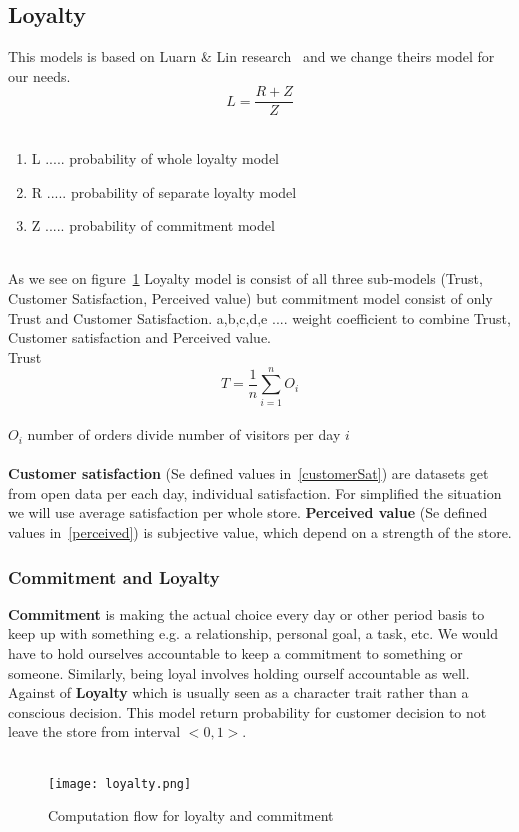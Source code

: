 \subsection{Loyalty} \label{subsec:model_loyalty}
This models is based on Luarn \& Lin research~\cite{luarn} and we change theirs model for our needs.\\
\begin{equation} \label{eq:30}
L = \frac{R+Z}{Z}
\end{equation}
\\
\begin{enumerate}
    \item L ..... probability of whole loyalty model
    \item R ..... probability of separate loyalty model
    \item Z ..... probability of commitment model
\end{enumerate}
\\
As we see on figure~\ref{Loyalty scheme} Loyalty model is consist of all three sub-models (Trust, Customer Satisfaction, Perceived value)
but commitment model consist of only Trust and Customer Satisfaction.
a,b,c,d,e .... weight coefficient to combine Trust, Customer satisfaction and Perceived value.\\
\newpage
Trust
\begin{equation} \label{eq:31}
T = \frac{1}{n} \sum_{i=1}^{n} O_i
\end{equation}
\\
$O_i$ number of orders divide number of visitors per day $i$
\\
\\
\textbf{Customer satisfaction} (Se defined values in~\ref{customerSat}) are datasets get from open data per each day, individual satisfaction.
For simplified the situation we will use average satisfaction per whole store.
\textbf{Perceived value} (Se defined values in~\ref{perceived}) is subjective value, which depend on a strength of the store.
\subsubsection{Commitment and Loyalty} \label{subsubsec:model_loyalty_commitment}
\textbf{Commitment} is making the actual choice every day or other period basis to keep up with something e.g. a relationship, personal goal, a task, etc.
We would have to hold ourselves accountable to keep a commitment to something or someone.
Similarly, being loyal involves holding ourself accountable as well.
Against of \textbf{Loyalty} which is usually seen as a character trait rather than a conscious decision.
This model return probability for customer decision to not leave the store from interval $<0,1>$.\\
\\
\begin{figure}[h!]
    \begin{center}
        \texttt{[image: loyalty.png]}
    \end{center}
    \caption{Computation flow for loyalty and commitment~\cite{luarn}}
    \label{Loyalty scheme}
\end{figure}\\
\newpage
